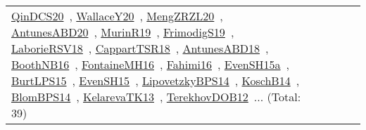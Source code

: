 {\begin{longtable}{lp{3cm}>{\raggedright\arraybackslash}p{6cm}>{\raggedright\arraybackslash}p{6cm}>{\raggedright\arraybackslash}p{8cm}}
\href{../works/QinDCS20.pdf}{QinDCS20}~\cite{QinDCS20}, \href{../works/WallaceY20.pdf}{WallaceY20}~\cite{WallaceY20}, \href{../works/MengZRZL20.pdf}{MengZRZL20}~\cite{MengZRZL20}, \href{../works/AntunesABD20.pdf}{AntunesABD20}~\cite{AntunesABD20}, \href{../works/MurinR19.pdf}{MurinR19}~\cite{MurinR19}, \href{../works/FrimodigS19.pdf}{FrimodigS19}~\cite{FrimodigS19}, \href{../works/LaborieRSV18.pdf}{LaborieRSV18}~\cite{LaborieRSV18}, \href{../works/CappartTSR18.pdf}{CappartTSR18}~\cite{CappartTSR18}, \href{../works/AntunesABD18.pdf}{AntunesABD18}~\cite{AntunesABD18}, \href{../works/BoothNB16.pdf}{BoothNB16}~\cite{BoothNB16}, \href{../works/FontaineMH16.pdf}{FontaineMH16}~\cite{FontaineMH16}, \href{../works/Fahimi16.pdf}{Fahimi16}~\cite{Fahimi16}, \href{../works/EvenSH15a.pdf}{EvenSH15a}~\cite{EvenSH15a}, \href{../works/BurtLPS15.pdf}{BurtLPS15}~\cite{BurtLPS15}, \href{../works/EvenSH15.pdf}{EvenSH15}~\cite{EvenSH15}, \href{../works/LipovetzkyBPS14.pdf}{LipovetzkyBPS14}~\cite{LipovetzkyBPS14}, \href{../works/KoschB14.pdf}{KoschB14}~\cite{KoschB14}, \href{../works/BlomBPS14.pdf}{BlomBPS14}~\cite{BlomBPS14}, \href{../works/KelarevaTK13.pdf}{KelarevaTK13}~\cite{KelarevaTK13}, \href{../works/TerekhovDOB12.pdf}{TerekhovDOB12}~\cite{TerekhovDOB12}... (Total: 39)\\

\end{longtable}}
